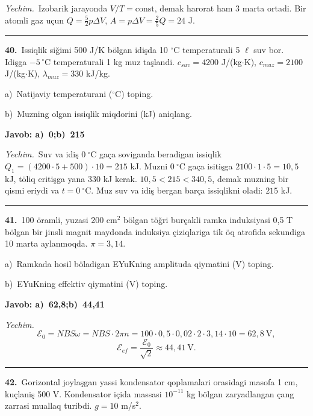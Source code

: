 \documentclass[11pt,a4paper]{article}
\begin{document}
\noindent\textit{Yechim.}\ Izobarik jarayonda $V/T=\text{const}$, demak harorat ham 3 marta ortadi. Bir atomli gaz uçun $Q=\frac52p\Delta V$, $A=p\Delta V=\frac25Q=24$ J.\par\par\medskip\hrule\medskip
{}\noindent\textbf{40.}\ Issiqlik siğimi 500 J/K bölgan idişda 10 $^\circ$C temperaturali 5 $\ell$ suv bor. Idişga $-5\,^\circ$C temperaturali 1 kg muz taşlandi. $c_{suv}=4200$ J/(kg$\cdot$K), $c_{muz}=2100$ J/(kg$\cdot$K), $\lambda_{muz}=330$ kJ/kg.\par
\noindent\hspace*{4mm}a)\ Natijaviy temperaturani ($^\circ$C) toping.\par
\noindent\hspace*{4mm}b)\ Muzning olgan issiqlik miqdorini (kJ) aniqlang.\par
\noindent\colorbox{gray!12}{\parbox{\dimexpr\linewidth-2\fboxsep}{\textbf{Javob: a)\ 0;\quad b)\ 215}}}\par\smallskip
\noindent\textit{Yechim.}\ Suv va idiş $0\ ^\circ$C gaça soviganda beradigan issiqlik $Q_1=(4200\cdot5+500)\cdot10=215$ kJ. Muzni $0\ ^\circ$C gaça isitişga $2100\cdot1\cdot5=10{,}5$ kJ, töliq eritişga yana $330$ kJ kerak. $10{,}5<215<340{,}5$, demak muzning bir qismi eriydi va $t=0\ ^\circ$C. Muz suv va idiş bergan barça issiqlikni oladi: $215$ kJ.\par\par\medskip\hrule\medskip
{}\noindent\textbf{41.}\ 100 öramli, yuzasi 200 cm$^2$ bölgan töğri burçakli ramka induksiyasi 0,5 T bölgan bir jinsli magnit maydonda induksiya çiziqlariga tik öq atrofida sekundiga 10 marta aylanmoqda. $\pi=3{,}14$.\par
\noindent\hspace*{4mm}a)\ Ramkada hosil böladigan EYuKning amplituda qiymatini (V) toping.\par
\noindent\hspace*{4mm}b)\ EYuKning effektiv qiymatini (V) toping.\par
\noindent\colorbox{gray!12}{\parbox{\dimexpr\linewidth-2\fboxsep}{\textbf{Javob: a)\ 62,8;\quad b)\ 44,41}}}\par\smallskip
\noindent\textit{Yechim.}\ \[\mathcal E_0=NBS\omega=NBS\cdot2\pi n=100\cdot0{,}5\cdot0{,}02\cdot2\cdot3{,}14\cdot10=62{,}8\ \text{V},\]
\[\mathcal E_{ef}=\frac{\mathcal E_0}{\sqrt2}\approx44{,}41\ \text{V}.\]\par\medskip\hrule\medskip
{}\noindent\textbf{42.}\ Gorizontal joylaşgan yassi kondensator qoplamalari orasidagi masofa 1 cm, kuçlaniş 500 V. Kondensator içida massasi $10^{-11}$ kg bölgan zaryadlangan çang zarrasi muallaq turibdi. $g=10$ m/s$^2$.\par
\end{document}
